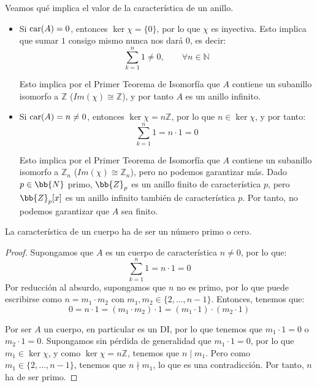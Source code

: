 Veamos qué implica el valor de la característica de un anillo.
\begin{itemize}
    \item Si $\operatorname{car}(A) = 0$, entonces $\ker\chi = \{0\}$, por lo que $\chi$ es inyectiva. Esto implica que sumar $1$ consigo mismo nunca nos dará $0$, es decir:
    \begin{equation*}
        \sum\limits_{k=1}^{n} 1 \neq 0, \qquad \forall n\in \mathbb{N}
    \end{equation*}

    Esto implica por el Primer Teorema de Isomorfía que $A$ contiene un subanillo isomorfo a $\mathbb{Z}$ ($Im(\chi) \cong \mathbb{Z}$), y por tanto $A$ es un anillo infinito.
    \item Si $\operatorname{car}(A) = n\neq 0$, entonces $\ker\chi = n\mathbb{Z}$, por lo que $n\in \ker\chi$, y por tanto:
    \begin{equation*}
        \sum\limits_{k=1}^{n} 1 = n\cdot 1 = 0
    \end{equation*}

    Esto implica por el Primer Teorema de Isomorfía que $A$ contiene un subanillo isomorfo a $\mathbb{Z}_n$ ($Im(\chi) \cong \mathbb{Z}_n$), pero no podemos garantizar más. Dado $p\in \bb{N}$ primo, $\bb{Z}_p$ es un anillo finito de característica $p$, pero $\bb{Z}_p[x]$ es un anillo infinito también de característica $p$. Por tanto, no podemos garantizar que $A$ sea finito.
\end{itemize}


\begin{prop}\label{prop:carac_primo}
    La característica de un cuerpo ha de ser un número primo o cero.
    \begin{proof}
        Supongamos que $A$ es un cuerpo de característica $n\neq 0$, por lo que:
        \begin{equation*}
            \sum\limits_{k=1}^{n}1 = n\cdot 1 = 0
        \end{equation*}
        Por reducción al absurdo, supongamos que $n$ no es primo, por lo que puede escribirse como $n = m_1\cdot m_2$ con $m_1,m_2\in \{2,\ldots,n-1\}$. Entonces, tenemos que:
        \begin{equation*}
            0 = n\cdot 1 = (m_1\cdot m_2)\cdot 1 = (m_1\cdot 1)\cdot (m_2\cdot 1)
        \end{equation*}

        Por ser $A$ un cuerpo, en particular es un DI, por lo que tenemos que $m_1\cdot 1 = 0$ o $m_2\cdot 1 = 0$. Supongamos sin pérdida de generalidad que $m_1\cdot 1 = 0$, por lo que $m_1\in \ker\chi$, y como $\ker\chi = n\mathbb{Z}$, tenemos que $n\mid m_1$. Pero como $m_1\in \{2,\ldots,n-1\}$, tenemos que $n\nmid m_1$, lo que es una contradicción. Por tanto, $n$ ha de ser primo.
    \end{proof}
\end{prop}


